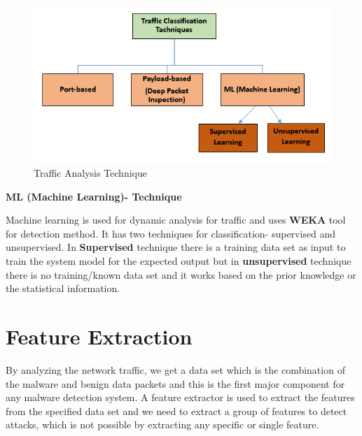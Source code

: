 \begin{figure}[ht]
    \centering
    \includegraphics{Chap4/trafficanalysis.png}
    \caption{Traffic Analysis Technique}
    \label{fig:traffic_analysis}
\end{figure}

\textbf{ML (Machine Learning)- Technique}

Machine learning is used for dynamic analysis for traffic and uses \textbf{WEKA} tool for detection method. It has two techniques for classification- supervised and unsupervised. In \textbf{Supervised} technique there is a training data set as input to train the system model for the expected output but in \textbf{unsupervised} technique there is no training/known data set and it works based on the prior knowledge or the statistical information.



\section{Feature Extraction}

By analyzing the network traffic, we get a data set which is the combination of the malware and benign data packets and this is the first major component for any malware detection system. A feature extractor is used to extract the features from the specified data set and we need to extract a group of features to detect attacks, which is not possible by extracting any specific or single feature.

